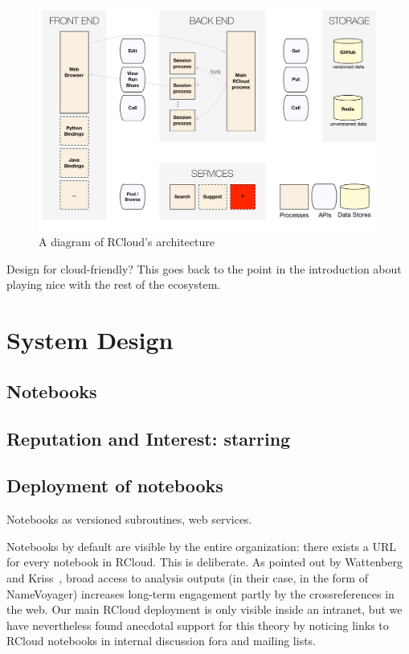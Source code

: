 \documentclass[review,journal]{vgtc}         %
\begin{document}
\begin{figure}
\hspace{-0.08\linewidth}
\includegraphics[width=1.1\linewidth]{fig/system/system.pdf}
\caption{\label{fig:system}A diagram of RCloud's architecture}
\end{figure}

Design for cloud-friendly? This goes back to the point in the
introduction about playing nice with the rest of the ecosystem.

\section{System Design}

\subsection{Notebooks\label{sec:notebooks}}

\subsection{Reputation and Interest: starring\label{sec:starring}}

\subsection{Deployment of notebooks\label{sec:deployment}}

Notebooks as versioned subroutines, web services.

Notebooks by default are visible by the entire organization: there
exists a URL for every notebook in RCloud. This is deliberate. As
pointed out by Wattenberg and Kriss~\cite{Wattenberg:2011:DFS}, broad
access to analysis outputs (in their case, in the form of NameVoyager)
increases long-term engagement partly by the crossreferences in the
web. Our main RCloud deployment is only visible inside an intranet,
but we have nevertheless found anecdotal support for this theory by
noticing links to RCloud notebooks in internal discussion fora and
mailing lists.
\end{document}
